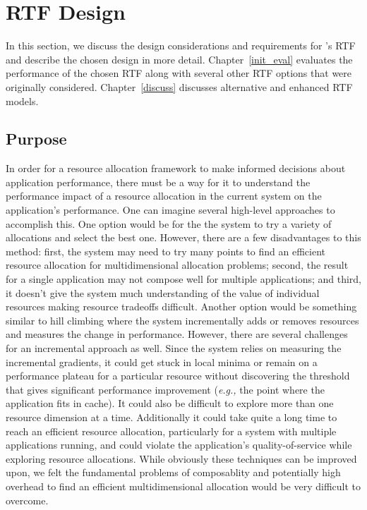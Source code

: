 \section{RTF Design}\label{RTFs}


In this section, we discuss the design considerations and requirements for \pacora's RTF and describe the chosen design in more detail. Chapter~\ref{init_eval} evaluates the performance of the chosen RTF along with several other RTF options that were originally considered. Chapter~\ref{discuss} discusses alternative and enhanced RTF models.

\subsection{Purpose}

In order for a resource allocation framework to make informed decisions about application performance, there must be a way for it to understand the performance impact of a resource allocation in the current system on the application's performance.  One can imagine several high-level approaches to accomplish this. One option would be for the the system to try a variety of allocations and select the best one.  However, there are a few disadvantages to this method: first, the system may need to try many points to find an efficient resource allocation for multidimensional allocation problems; second, the result for a single application may not compose well for multiple applications; and third, it doesn't give the system much understanding of the value of individual resources making resource tradeoffs difficult.  Another option would be something similar to hill climbing where the system incrementally adds or removes resources and measures the change in performance.  However, there are several challenges for an incremental approach as well.  Since the system relies on measuring the incremental gradients, it could get stuck in local minima or remain on a performance plateau for a particular resource without discovering the threshold that gives significant performance improvement (\emph{e.g.,} the point where the application fits in cache).  It could also be difficult to explore more than one resource dimension at a time. Additionally it could take quite a long time to reach an efficient resource allocation, particularly for a system with multiple applications running, and could violate the application's quality-of-service while exploring resource allocations.  While obviously these techniques can be improved upon, we felt the fundamental problems of composablity and potentially high overhead to find an efficient multidimensional allocation would be very difficult to overcome. 

